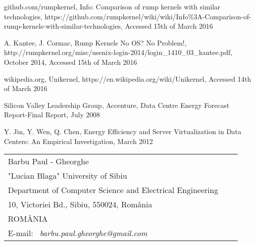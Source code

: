 \documentclass[10pt,a4paper,twoside]{article}
\begin{document}
\begin{thebibliography}{*}\label{Refences}
github.com/rumpkernel, \newblock Info: Comparison of rump kernels with similar technologies,
\newblock https://github.com/rumpkernel/wiki/wiki/Info\%3A-Comparison-of-rump-kernels-with-similar-technologies,
\newblock Accessed 15th of March 2016

\vspace{-7pt}
A. Kantee, J. Cormac, \newblock Rump Kernels No OS? No Problem!,
\newblock http://rumpkernel.org/misc/usenix-login-2014/login\_1410\_03\_kantee.pdf,
\newblock October 2014,
\newblock Accessed 15th of March 2016

\vspace{-7pt}
wikipedia.org, \newblock Unikernel,
\newblock https://en.wikipedia.org/wiki/Unikernel,
\newblock Accessed 14th of March 2016

\vspace{-7pt}
Silicon Valley Leadership Group, Accenture, \newblock
Data Centre Energy Forecast Report-Final Report, \newblock July 2008

\vspace{-7pt}
Y. Jin, Y. Wen, Q. Chen,
\newblock Energy Efficiency and Server Virtualization in Data Centers: An Empirical Investigation,
\newblock March 2012

\end{thebibliography}

\vspace*{1cm} {\footnotesize
\begin{tabular*}{16cm}{p{4.2cm}p{4.2cm}p{4.2cm}}
Barbu Paul - Gheorghe & \\
"Lucian Blaga" University of Sibiu & \\
Department of Computer Science and Electrical Engineering & \\
10, Victoriei Bd., Sibiu, 550024, Rom\^ania & \\
ROM\^ANIA & \\
E-mail: \ {\it barbu.paul.gheorghe@gmail.com}&
\end{tabular*}}
\end{document}
